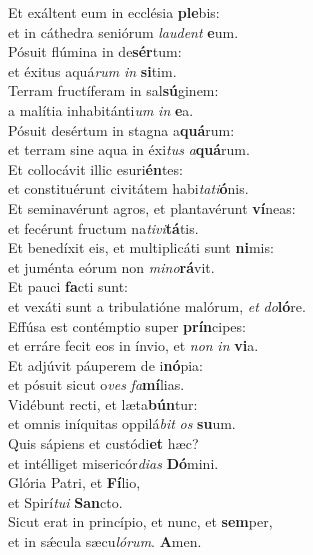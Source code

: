 \evenverse Et exáltent eum in ecclésia \textbf{ple}bis:~\*\\
\evenverse et in cáthedra seniórum \textit{lau}\textit{dent} \textbf{e}um.\\
\oddverse Pósuit flúmina in de\textbf{sér}tum:~\*\\
\oddverse et éxitus aquá\textit{rum} \textit{in} \textbf{si}tim.\\
\evenverse Terram fructíferam in sal\textbf{sú}ginem:~\*\\
\evenverse a malítia inhabitánti\textit{um} \textit{in} \textbf{e}a.\\
\oddverse Pósuit desértum in stagna a\textbf{quá}rum:~\*\\
\oddverse et terram sine aqua in éxi\textit{tus} \textit{a}\textbf{quá}rum.\\
\evenverse Et collocávit illic esuri\textbf{én}tes:~\*\\
\evenverse et constituérunt civitátem habi\textit{ta}\textit{ti}\textbf{ó}nis.\\
\oddverse Et seminavérunt agros, et plantavérunt \textbf{ví}neas:~\*\\
\oddverse et fecérunt fructum na\textit{ti}\textit{vi}\textbf{tá}tis.\\
\evenverse Et benedíxit eis, et multiplicáti sunt \textbf{ni}mis:~\*\\
\evenverse et juménta eórum non \textit{mi}\textit{no}\textbf{rá}vit.\\
\oddverse Et pauci \textbf{fa}cti sunt:~\*\\
\oddverse et vexáti sunt a tribulatióne malórum, \textit{et} \textit{do}\textbf{ló}re.\\
\evenverse Effúsa est contémptio super \textbf{prín}cipes:~\*\\
\evenverse et erráre fecit eos in ínvio, et \textit{non} \textit{in} \textbf{vi}a.\\
\oddverse Et adjúvit páuperem de i\textbf{nó}pia:~\*\\
\oddverse et pósuit sicut o\textit{ves} \textit{fa}\textbf{mí}lias.\\
\evenverse Vidébunt recti, et læta\textbf{bún}tur:~\*\\
\evenverse et omnis iníquitas oppilá\textit{bit} \textit{os} \textbf{su}um.\\
\oddverse Quis sápiens et custódi\textbf{et} hæc?~\*\\
\oddverse et intélliget misericór\textit{di}\textit{as} \textbf{Dó}mini.\\
\evenverse Glória Patri, et \textbf{Fí}lio,~\*\\
\evenverse et Spirí\textit{tu}\textit{i} \textbf{San}cto.\\
\oddverse Sicut erat in princípio, et nunc, et \textbf{sem}per,~\*\\
\oddverse et in sǽcula sæcu\textit{ló}\textit{rum}. \textbf{A}men.\\
